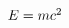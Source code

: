 \documentclass{article}
\DeclareRobustCommand{\MyMathModeMacro}{%
        \ifmmode
             E = m c^2
        \else
            \GenericError{(my preamble)}
                {Attempt to use MyMathModeMacro outside of math mode}
                {See my preamble documentation for explanation.}
                {Need to use either use inline or display math.}%
        \fi
    }%
\begin{document}
$\MyMathModeMacro$

\end{document}
